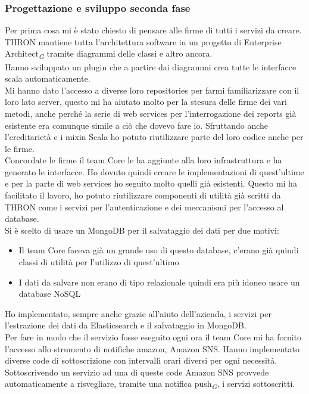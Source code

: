 \documentclass[a4paper, 12pt, twoside, openright]{book}
\newcommand{\gloss}[1]{#1\textsubscript{\textit{\tiny{G}}}}
\begin{document}
\subsubsection{Progettazione e sviluppo seconda fase}
Per prima cosa mi è stato chiesto di pensare alle firme di tutti i servizi da creare. THRON mantiene tutta l'architettura software in un progetto di \gloss{Enterprise Architect} tramite diagrammi delle classi e altro ancora.\\
Hanno sviluppato un plugin che a partire dai diagrammi crea tutte le interfacce scala automaticamente.\\
Mi hanno dato l'accesso a diverse loro repositories per farmi familiarizzare con il loro lato server, questo mi ha aiutato molto per la stesura delle firme dei vari metodi, anche perché la serie di web services per l'interrogazione dei reports già esistente era comunque simile a ciò che dovevo fare io. Sfruttando anche l'ereditarietà e i mixin Scala ho potuto riutilizzare parte del loro codice anche per le firme.\\
Concordate le firme il team Core le ha aggiunte alla loro infrastruttura e ha generato le interfacce. Ho dovuto quindi creare le implementazioni di quest'ultime e per la parte di web services ho seguito molto quelli già esistenti. Questo mi ha facilitato il lavoro, ho potuto riutilizzare componenti di utilità già scritti da THRON come i servizi per l'autenticazione e dei meccanismi per l'accesso al database.\\
Si è scelto di usare un MongoDB per il salvataggio dei dati per due motivi:
\begin{itemize}
	\item Il team Core faceva già un grande uso di questo database, c'erano già quindi classi di utilità per l'utilizzo di quest'ultimo
	\item I dati da salvare non erano di tipo relazionale quindi era più idoneo usare un database NoSQL
\end{itemize}
Ho implementato, sempre anche grazie all'aiuto dell'azienda, i servizi per l'estrazione dei dati da Elasticsearch e il salvataggio in MongoDB.\\
Per fare in modo che il servizio fosse eseguito ogni ora il team Core mi ha fornito l'accesso allo strumento di notifiche amazon, Amazon SNS. Hanno implementato diverse code di sottoscrizione con intervalli orari diversi per ogni necessità. Sottoscrivendo un servizio ad una di queste code Amazon SNS provvede automaticamente a risvegliare, tramite una \gloss{notifica push}, i servizi sottoscritti.\\
\end{document}
